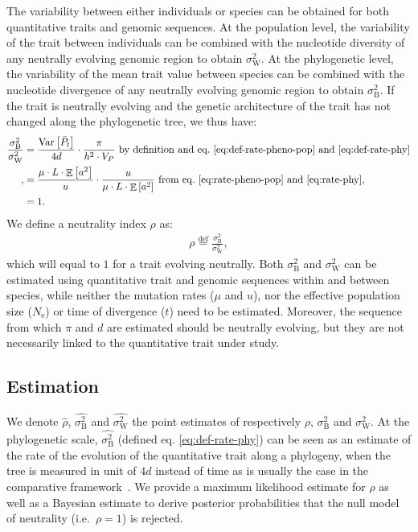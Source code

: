 \documentclass{article}
\newcommand{\defEqual}{\stackrel{\text{def}}{=}}
\newcommand{\Multiply}{\cdot}
\DeclareMathOperator{\E}{\mathbb{E}}
\DeclareMathOperator{\Var}{\text{Var}}
\newcommand{\Ne}{N_{\text{e}}}
\newcommand{\Time}{t}
\newcommand{\Trait}{P}
\newcommand{\Heritability}{h^2}
\newcommand{\MeanTrait}{\bar{\Trait_{\Time}}}
\newcommand{\VarPhy}{\Var \left[\MeanTrait\right]}
\newcommand{\MutationRatePheno}{\mu}
\newcommand{\MutationRateNuc}{u}
\newcommand{\NbrLoci}{L}
\newcommand{\VarPhenotype}{V_{\Trait}}
\newcommand{\GenArchi}{\NbrLoci \Multiply \E \left[ a^2 \right]}
\newcommand{\RateBetween}{\sigma^2_{\mathrm{B}}}
\newcommand{\RateWhithin}{\sigma^2_{\mathrm{W}}}
\newcommand{\EstRateBetween}{\widehat{\RateBetween}}
\newcommand{\EstRateWhithin}{\widehat{\RateWhithin}}
\newcommand{\NI}{\rho}
\newcommand{\EstNI}{\widehat{\rho}}
\begin{document}
The variability between either individuals or species can be obtained for both quantitative traits and genomic sequences.
At the population level, the variability of the trait between individuals can be combined with the nucleotide diversity of any neutrally evolving genomic region to obtain $\RateWhithin$.
At the phylogenetic level, the variability of the mean trait value between species can be combined with the nucleotide divergence of any neutrally evolving genomic region to obtain $\RateBetween$.
If the trait is neutrally evolving and the genetic architecture of the trait has not changed along the phylogenetic tree, we thus have:
\begin{align}
    \frac{\RateBetween}{\RateWhithin} &= \frac{\VarPhy}{4 d} \Multiply \frac{\pi}{\Heritability \Multiply \VarPhenotype} \text{ by definition and eq.~\ref{eq:def-rate-pheno-pop} and~\ref{eq:def-rate-phy}}\\,
 &= \frac{\MutationRatePheno \Multiply \GenArchi}{\MutationRateNuc} \Multiply \frac{\MutationRateNuc}{\MutationRatePheno \Multiply \GenArchi} \text{ from eq.~\ref{eq:rate-pheno-pop} and~\ref{eq:rate-phy}}, \\
    &= 1.
\end{align}
We define a neutrality index $\NI$ as:
\begin{align}
\NI \defEqual \frac{\RateBetween}{\RateWhithin},
\end{align}
 which will equal to $1$ for a trait evolving neutrally.
Both $\RateBetween$ and $\RateWhithin$ can be estimated using quantitative trait and genomic sequences within and between species, while neither the mutation rates ($\MutationRatePheno$ and $\MutationRateNuc$), nor the effective population size ($\Ne$) or time of divergence ($\Time$) need to be estimated.
Moreover, the sequence from which $\pi$ and $d$ are estimated should be neutrally evolving, but they are not necessarily linked to the quantitative trait under study.

\subsection{Estimation}\label{subsec:estimate}

We denote $\EstNI$, $\EstRateBetween$ and $\EstRateWhithin$ the point estimates of respectively $\NI$, $\RateBetween$ and $\RateWhithin$.
At the phylogenetic scale, $\EstRateBetween$ (defined eq. \ref{eq:def-rate-phy}) can be seen as an estimate of the rate of the evolution of the quantitative trait along a phylogeny, when the tree is measured in unit of $4d$ instead of time as is usually the case in the comparative framework~\parencite{felsenstein_phylogenies_1985, omeara_testing_2006}.
We provide a maximum likelihood estimate for $\NI$ as well as a Bayesian estimate to derive posterior probabilities that the null model of neutrality (i.e.~$\NI = 1$) is rejected.
\end{document}
